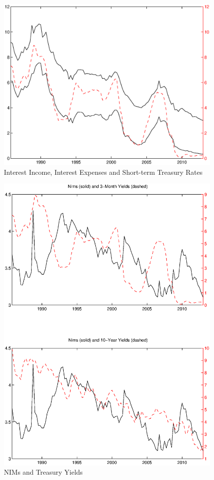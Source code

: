 \documentclass[11pt]{article}
\begin{document}
\newpage \clearpage
\newpage \clearpage
\begin{figure}
\caption{Interest Income, Interest Expenses and Short-term Treasury Rates} \label{figure_nims_components}
\center
\includegraphics[scale=0.85]{figure_nims_components.ps}
\end{figure}


\begin{figure}
\caption{NIMs and Treasury Yields} \label{figure_nims_rates}
\center
\includegraphics[scale=0.85]{figure_nims_rates.ps}
\end{figure}
\end{document}
